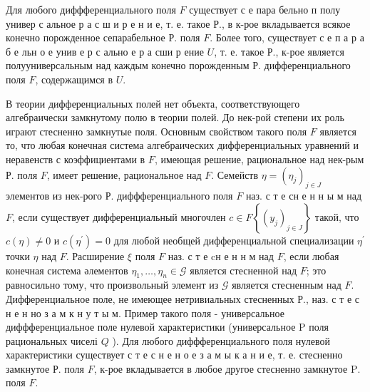 \documentclass[10pt]{article}
\begin{document}
Для любого диффференциального поля $F$ существует с е пара бельно п полу универ с альное р а с ш и р е н и е, т. е. такое Р., в к-рое вкладывается всякое конечно порожденное сепарабельное Р. поля $F$. Более того, существует с е п а р а б е льн о е унив е р с ально е р а сши р ение $U$, т. е. такое Р., к-рое является полууниверсальным над каждым конечно порожденным Р. дифференциального поля $F$, содержащимся в $U$.



В теории дифференциальных полей нет объекта, соответствующего алгебраически замкнутому полю в теории полей. До нек-рой степени их роль играют стесненно замкнутые поля. Основным свойством такого поля $F$ является то, что любая конечная система алгебраических дифференциальных уравнений и неравенств с коэффициентами в $F$, имеющая решение, рациональное над нек-рым Р. поля $F$, имеет решение, рациональное над $F$. Семейств $\eta=\left(\eta_{j}\right)_{j \in J}$ элементов из нек-рого Р. диффференциального поля $F$ наз. с т е сн е н н ы м над $F$, если существует дифференциальный многочлен $c \in F\left\{\left(y_{j}\right)_{j \in J}\right\}$ такой, что $c(\eta) \neq 0$ и $c\left(\eta^{\prime}\right)=0$ для любой необщей дифференциальной специализации $\eta^{\prime}$ точки $\eta$ над $F$. Расширение $\xi$ поля $F$ наз. с т е cн е н н м над $F$, если любая конечная система әлементов $\eta_{1}, \ldots, \eta_{n} \in \mathcal{G}$ является стесненной над $F$; это равносильно тому, что произвольный элемент из $\mathcal{G}$ является стесненным над $F$. Дифференциальное поле, не имеющее нетривиальных стесненных Р., наз. с т е с н е н но з а м к н у т ы м. Пример такого поля - универсальное диффференциальное поле нулевой характеристики (универсальное $\mathrm{P}$ поля рациональных чиселі $Q$ ). Для любого диффференциального поля нулевой характеристики существует с т е с н е н о е з а м ы к а н и е, т. е. стесненно замкнутое Р. поля $F$, к-рое вкладывается в любое другое стесненно замкнутое $\mathrm{P}$. поля $F$.
\end{document}

